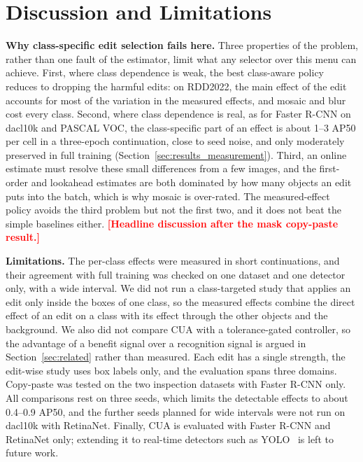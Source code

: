 \documentclass[conference]{IEEEtran}
\newcommand{\todo}[1]{\textcolor{red}{\textbf{[#1]}}}
\begin{document}
\section{Discussion and Limitations}
\label{sec:discussion}

\noindent\textbf{Why class-specific edit selection fails here.} Three properties of the problem, rather than one fault of the estimator, limit what any selector over this menu can achieve. First, where class dependence is weak, the best class-aware policy reduces to dropping the harmful edits: on RDD2022, the main effect of the edit accounts for most of the variation in the measured effects, and mosaic and blur cost every class. Second, where class dependence is real, as for Faster R-CNN on dacl10k and PASCAL VOC, the class-specific part of an effect is about 1--3 AP50 per cell in a three-epoch continuation, close to seed noise, and only moderately preserved in full training (Section~\ref{sec:results_measurement}). Third, an online estimate must resolve these small differences from a few images, and the first-order and lookahead estimates are both dominated by how many objects an edit puts into the batch, which is why mosaic is over-rated. The measured-effect policy avoids the third problem but not the first two, and it does not beat the simple baselines either. \todo{Headline discussion after the mask copy-paste result.}

\noindent\textbf{Limitations.} The per-class effects were measured in short continuations, and their agreement with full training was checked on one dataset and one detector only, with a wide interval. We did not run a class-targeted study that applies an edit only inside the boxes of one class, so the measured effects combine the direct effect of an edit on a class with its effect through the other objects and the background. We also did not compare CUA with a tolerance-gated controller, so the advantage of a benefit signal over a recognition signal is argued in Section~\ref{sec:related} rather than measured. Each edit has a single strength, the edit-wise study uses box labels only, and the evaluation spans three domains. Copy-paste was tested on the two inspection datasets with Faster R-CNN only. All comparisons rest on three seeds, which limits the detectable effects to about 0.4--0.9 AP50, and the further seeds planned for wide intervals were not run on dacl10k with RetinaNet. Finally, CUA is evaluated with Faster R-CNN and RetinaNet only; extending it to real-time detectors such as YOLO~\cite{bochkovskiy2020yolov4} is left to future work.




\end{document}
